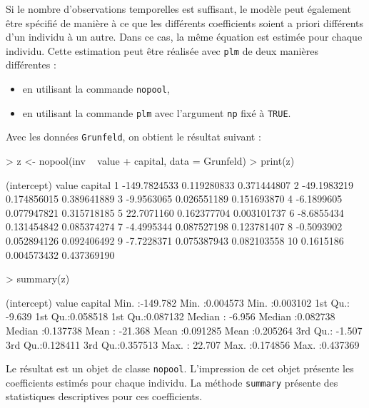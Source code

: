 \documentclass[a4paper]{article}
\begin{document}
Si le nombre d'observations temporelles est suffisant, le modèle peut
également être spécifié de manière à ce que les différents
coefficients soient a priori différents d'un individu à un autre. Dans
ce cas, la même équation est estimée pour chaque individu. Cette
estimation peut être réalisée avec \texttt{plm} de deux manières
différentes :

\begin{itemize}
\item en utilisant la commande \texttt{nopool},
\item en utilisant la commande \texttt{plm} avec l'argument
  \texttt{np} fixé à \texttt{TRUE}.
\end{itemize}


Avec les données \texttt{Grunfeld}, on obtient le résultat suivant :


\begin{Schunk}
\begin{Sinput}
> z <- nopool(inv ~ value + capital, data = Grunfeld)
> print(z)
\end{Sinput}
\begin{Soutput}
    (intercept)       value     capital
1  -149.7824533 0.119280833 0.371444807
2   -49.1983219 0.174856015 0.389641889
3    -9.9563065 0.026551189 0.151693870
4    -6.1899605 0.077947821 0.315718185
5    22.7071160 0.162377704 0.003101737
6    -8.6855434 0.131454842 0.085374274
7    -4.4995344 0.087527198 0.123781407
8    -0.5093902 0.052894126 0.092406492
9    -7.7228371 0.075387943 0.082103558
10    0.1615186 0.004573432 0.437369190
\end{Soutput}
\begin{Sinput}
> summary(z)
\end{Sinput}
\begin{Soutput}
  (intercept)           value             capital        
 Min.   :-149.782   Min.   :0.004573   Min.   :0.003102  
 1st Qu.:  -9.639   1st Qu.:0.058518   1st Qu.:0.087132  
 Median :  -6.956   Median :0.082738   Median :0.137738  
 Mean   : -21.368   Mean   :0.091285   Mean   :0.205264  
 3rd Qu.:  -1.507   3rd Qu.:0.128411   3rd Qu.:0.357513  
 Max.   :  22.707   Max.   :0.174856   Max.   :0.437369  
\end{Soutput}
\end{Schunk}


Le résultat est un objet de classe \texttt{nopool}. L'impression de
cet objet présente les coefficients estimés pour chaque individu. La
méthode \texttt{summary} présente des statistiques descriptives pour
ces coefficients.
\end{document}
